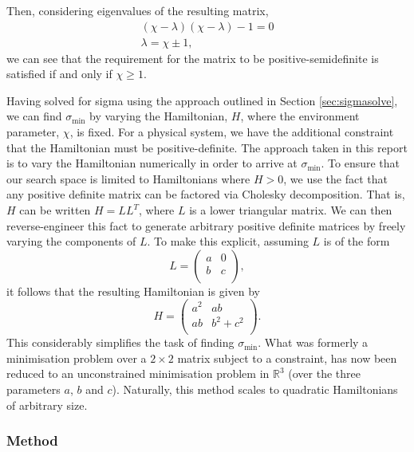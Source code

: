 \documentclass[11pt,a4paper]{article}
\numberwithin{equation}{section}
\begin{document}
	Then, considering eigenvalues of the resulting matrix,
	\begin{align*}
	&(\chi- \lambda)(\chi- \lambda) - 1 = 0&\\
	&\lambda = \chi \pm 1,&
	\end{align*}
	we can see that the requirement for the matrix to be positive-semidefinite is satisfied if and only if $\chi \geq 1$. 
	
	Having solved for sigma using the approach outlined in Section \ref{sec:sigmasolve}, we can find $\sigma_\text{min}$ by varying the Hamiltonian, $H$, where the environment parameter, $\chi$, is fixed. For a physical system, we have the additional constraint that the Hamiltonian must be positive-definite. The approach taken in this report is to vary the Hamiltonian numerically in order to arrive at $\sigma_\text{min}$. To ensure that our search space is limited to Hamiltonians where $H>0$, we use the fact that any positive definite matrix can be factored via Cholesky decomposition. That is, $H$ can be written	$H = LL^T$,	where $L$ is a lower triangular matrix. We can then reverse-engineer this fact to generate arbitrary positive definite matrices by freely varying the components of $L$. To make this explicit, assuming $L$ is of the form \begin{equation}\label{eq:39}
	L = \begin{pmatrix}
	a & 0  \\
	b & c\\
	\end{pmatrix},
	\end{equation}
	it follows that the resulting Hamiltonian is given by
	\begin{equation} \label{eq:41}
	H = \begin{pmatrix}
	a^{2} & ab  \\
	ab & b^{2}+c^{2}\\
	\end{pmatrix}.
	\end{equation}
	This considerably simplifies the task of finding $\sigma_\text{min}$. What was formerly a minimisation problem over a $2\times2$ matrix subject to a constraint, has now been reduced to an unconstrained minimisation problem in $\mathbb{R}^3$ (over the three parameters $a$, $b$ and $c$). Naturally, this method scales to quadratic Hamiltonians of arbitrary size.
	
	\subsubsection{Method}
\end{document}
